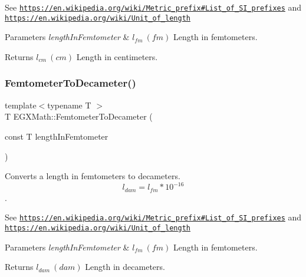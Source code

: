 See \href{https://en.wikipedia.org/wiki/Metric_prefix#List_of_SI_prefixes}{\tt https\+://en.\+wikipedia.\+org/wiki/\+Metric\+\_\+prefix\#\+List\+\_\+of\+\_\+\+S\+I\+\_\+prefixes} and \href{https://en.wikipedia.org/wiki/Unit_of_length}{\tt https\+://en.\+wikipedia.\+org/wiki/\+Unit\+\_\+of\+\_\+length} 
\begin{DoxyParams}{Parameters}
{\em length\+In\+Femtometer} & $ l_{fm}\ (fm)$ Length in femtometers. \\
\hline
\end{DoxyParams}
\begin{DoxyReturn}{Returns}
$ l_{cm}\ (cm)$ Length in centimeters. 
\end{DoxyReturn}
\mbox{\label{group___e_g_x_math-_conversions-_length_conversions-_femtometer-_s_i_ga8d583b77d39b4474a8081997067ffb66}} 
\subsubsection{\texorpdfstring{Femtometer\+To\+Decameter()}{FemtometerToDecameter()}}
{\footnotesize\ttfamily template$<$typename T $>$ \\
T E\+G\+X\+Math\+::\+Femtometer\+To\+Decameter (\begin{DoxyParamCaption}\item[{const T}]{length\+In\+Femtometer }\end{DoxyParamCaption})}



Converts a length in femtometers to decameters. \[ l_{dam}=l_{fm} * 10^{-16} \]. 

See \href{https://en.wikipedia.org/wiki/Metric_prefix#List_of_SI_prefixes}{\tt https\+://en.\+wikipedia.\+org/wiki/\+Metric\+\_\+prefix\#\+List\+\_\+of\+\_\+\+S\+I\+\_\+prefixes} and \href{https://en.wikipedia.org/wiki/Unit_of_length}{\tt https\+://en.\+wikipedia.\+org/wiki/\+Unit\+\_\+of\+\_\+length} 
\begin{DoxyParams}{Parameters}
{\em length\+In\+Femtometer} & $ l_{fm}\ (fm)$ Length in femtometers. \\
\hline
\end{DoxyParams}
\begin{DoxyReturn}{Returns}
$ l_{dam}\ (dam)$ Length in decameters. 
\end{DoxyReturn}
\mbox{\label{group___e_g_x_math-_conversions-_length_conversions-_femtometer-_s_i_gad0f3dba7d53c7f17223b7f7b0f4db523}} 
